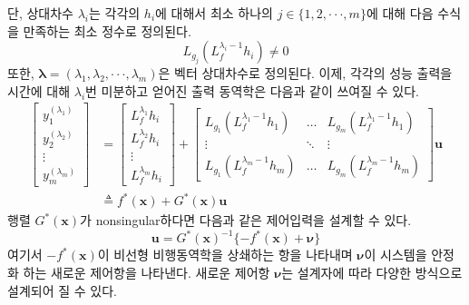 \documentclass[a4paper, 12pt]{report}
\begin{document}
단, 상대차수 $\lambda_{i}$는 각각의 $h_{i}$에 대해서 최소 하나의 $j \in \{1,2,\cdot\cdot\cdot,m\}$에 대해 다음 수식을 만족하는 최소 정수로 정의된다.
\begin{equation}\label{Eq:rela_deg_cond}
  L_{g_{j}}( L_{f}^{\lambda_{i}-1}h_{i} ) \neq 0
\end{equation}
또한, $\boldsymbol{\lambda}=(\lambda_{1},\lambda_{2},\cdot\cdot\cdot,\lambda_{m})$은 벡터 상대차수로 정의된다. 이제, 각각의 성능 출력을 시간에 대해 $\lambda_{i}$번 미분하고 얻어진 출력 동역학은 다음과 같이 쓰여질 수 있다.
\begin{equation}\label{Eq:output_dyn}
  \begin{split}
     \begin{bmatrix}
       y_{1}^{(\lambda_{1})} \\
       y_{2}^{(\lambda_{2})} \\
       \vdots \\
       y_{m}^{(\lambda_{m})}
     \end{bmatrix}
       &=
     \begin{bmatrix}
       L_{f}^{\lambda_{1}}h_{i} \\
       L_{f}^{\lambda_{2}}h_{i} \\
       \vdots \\
       L_{f}^{\lambda_{m}}h_{i}
     \end{bmatrix}
     +
     \begin{bmatrix}
       L_{g_{1}}( L_{f}^{\lambda_{1}-1}h_{1} ) & \dots & L_{g_{m}}( L_{f}^{\lambda_{1}-1}h_{1} ) \\
       \vdots & \ddots & \vdots \\
       L_{g_{1}}( L_{f}^{\lambda_{m}-1}h_{m} ) & \dots & L_{g_{m}}( L_{f}^{\lambda_{m}-1}h_{m} )
     \end{bmatrix}
     \mathbf{u} \\
     &\triangleq f^{*}(\mathbf{x}) + G^{*}(\mathbf{x})\mathbf{u}
  \end{split}
\end{equation}
행렬 $G^{*}(\mathbf{x})$가 nonsingular하다면 다음과 같은 제어입력을 설계할 수 있다.
\begin{equation}\label{Eq:NDI_input1}
  \mathbf{u} = G^{*}(\mathbf{x})^{-1}\{ -f^{*}(\mathbf{x}) + \boldsymbol{\nu} \}
\end{equation}
여기서 $-f^{*}(\mathbf{x})$이 비선형 비행동역학을 상쇄하는 항을 나타내며 $\boldsymbol{\nu}$이 시스템을 안정화 하는 새로운 제어항을 나타낸다. 새로운 제어항 $\boldsymbol{\nu}$는 설계자에 따라 다양한 방식으로 설계되어 질 수 있다. \par
\end{document}
